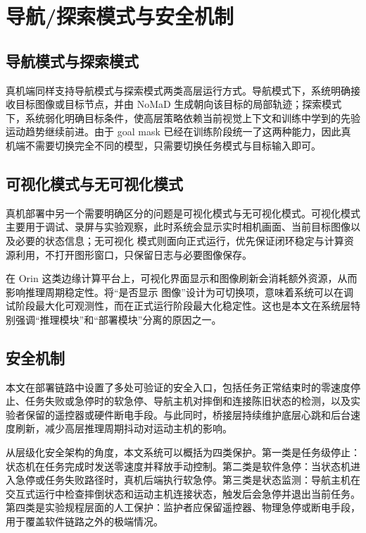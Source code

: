 \section{导航/探索模式与安全机制}

\subsection{导航模式与探索模式}

真机端同样支持导航模式与探索模式两类高层运行方式。导航模式下，系统明确接收目标图像或目标节点，并由 NoMaD
生成朝向该目标的局部轨迹；探索模式下，系统弱化明确目标条件，使高层策略依赖当前视觉上下文和训练中学到的先验运动趋势继续前进。由于 goal mask
已经在训练阶段统一了这两种能力\cite{nomad2023}，因此真机端不需要切换完全不同的模型，只需要切换任务模式与目标输入即可。


\subsection{可视化模式与无可视化模式}

真机部署中另一个需要明确区分的问题是可视化模式与无可视化模式。可视化模式主要用于调试、录屏与实验观察，此时系统会显示实时相机画面、当前目标图像以及必要的状态信息；无可视化
模式则面向正式运行，优先保证闭环稳定与计算资源利用，不打开图形窗口，只保留日志与必要图像保存。

在 Orin 这类边缘计算平台上，可视化界面显示和图像刷新会消耗额外资源，从而影响推理周期稳定性。将``是否显示
图像''设计为可切换项，意味着系统可以在调试阶段最大化可观测性，而在正式运行阶段最大化稳定性。这也是本文在系统层特别强调``推理模块''和``部署模块''分离的原因之一。

\subsection{安全机制}

本文在部署链路中设置了多处可验证的安全入口，包括任务正常结束时的零速度停止、任务失败或急停时的软急停、导航主机对摔倒和连接陈旧状态的检测，以及实验者保留的遥控器或硬件断电手段。与此同时，桥接层持续维护底层心跳和后台速度刷新，减少高层推理周期抖动对运动主机的影响。

从层级化安全架构的角度，本文系统可以概括为四类保护。第一类是任务级停止：状态机在任务完成时发送零速度并释放手动控制。第二类是软件急停：当状态机进入急停或任务失败路径时，真机后端执行软急停。第三类是状态监测：导航主机在交互式运行中检查摔倒状态和运动主机连接状态，触发后会急停并退出当前任务。第四类是实验规程层面的人工保护：监护者应保留遥控器、物理急停或断电手段，用于覆盖软件链路之外的极端情况。

